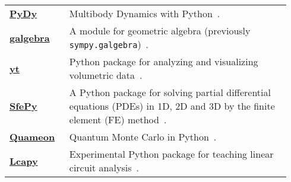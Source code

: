 \begin{longtable}[htbc]{>{\raggedright}p{0.2\linewidth}p{0.74\linewidth}}
\href{http://www.pydy.org/}{\textbf{PyDy}} & Multibody Dynamics with
  Python~\cite{gede2013constrained}. \\

\href{https://github.com/brombo/galgebra}{\textbf{galgebra}} &
  A module for geometric algebra (previously \texttt{sympy.galgebra})~\cite{galgebra}. \\

\href{http://yt-project.org/}{\textbf{yt}} & Python package for
  analyzing and visualizing volumetric data~\cite{2011ApJS..192....9T}. \\

\href{http://sfepy.org/}{\textbf{SfePy}} &
  A Python package for solving partial
  differential equations (PDEs) in 1D, 2D and 3D by the finite element (FE)
  method~\cite{Zienkiewicz2013FEM,cimrman2014sfepy}. \\

\href{http://quameon.sourceforge.net/}{\textbf{Quameon}} & Quantum
  Monte Carlo in Python~\cite{quameon}. \\

\href{http://lcapy.elec.canterbury.ac.nz/}{\textbf{Lcapy}} &
  Experimental Python package for teaching linear circuit analysis~\cite{lcapy}. \\
\bottomrule
\end{longtable}
